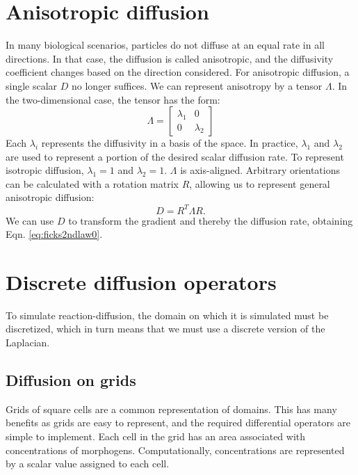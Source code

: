 \section{Anisotropic diffusion}
In many biological scenarios, particles do not diffuse at an equal rate in all directions. In that case, the diffusion is called anisotropic, and the diffusivity coefficient changes based on the direction considered. For anisotropic diffusion, a single scalar $D$ no longer suffices. We can represent anisotropy by a tensor $\Lambda$. In the two-dimensional case, the tensor has the form:
\begin{equation}
\label{eq:diffTensor}
\Lambda =
\begin{bmatrix}
    \lambda_1 & 0 \\
    0 & \lambda_2 
\end{bmatrix}
\end{equation}
Each $\lambda_i$ represents the diffusivity in a basis of the space. In practice, $\lambda_1$ and $\lambda_2$ are used to represent a portion of the desired scalar diffusion rate. To represent isotropic diffusion, $\lambda_1=1$ and $\lambda_2=1$. $\Lambda$ is axis-aligned. Arbitrary orientations can be calculated with a rotation matrix $R$, allowing us to represent general anisotropic diffusion:
\begin{equation}
\label{eq:anisoDiffTensor}
	D = R^T \Lambda R.
\end{equation}
We can use $D$ to transform the gradient and thereby the diffusion rate, obtaining Eqn. \ref{eq:ficks2ndlaw0}.

\section{Discrete diffusion operators}
To simulate reaction-diffusion, the domain on which it is simulated must be discretized, which in turn means that we must use a discrete version of the Laplacian.

\subsection{Diffusion on grids}
Grids of square cells are a common representation of domains. This has many benefits as grids are easy to represent, and the required differential operators are simple to implement. Each cell in the grid has an area associated with concentrations of morphogens. Computationally, concentrations are represented by a scalar value assigned to each cell.

